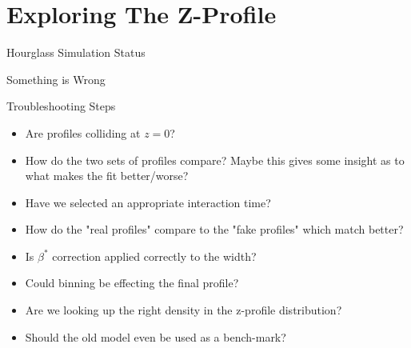 \section{Exploring The Z-Profile}
\label{ch:ExploringZProfile}

\begin{frame}{Hourglass Simulation Status}

\end{frame}

\begin{frame}{Something is Wrong}

\end{frame}

\begin{frame}{Troubleshooting Steps}

\begin{itemize}
  \item Are profiles colliding at $z = 0$?
  \item How do the two sets of profiles compare? Maybe this gives some insight as
  to what makes the fit better/worse?
  \item Have we selected an appropriate interaction time?
  \item How do the "real profiles" compare to the "fake profiles" which match better?
  \item Is $\beta^{*}$ correction applied correctly to the width?
  \item Could binning be effecting the final profile?
  \item Are we looking up the right density in the z-profile distribution?
  \item Should the old model even be used as a bench-mark?
\end{itemize}

\end{frame}

